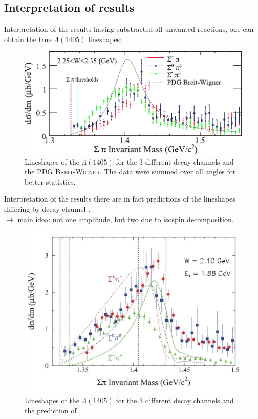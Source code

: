 \documentclass[11pt,aspectratio=1610,dvipsnames]{beamer}
\begin{document}
\subsection{Interpretation of results}
\begin{frame}{Interpretation of the results}
	having substracted all unwanted reactions, one can obtain the true $\Lambda(1405)$ lineshapes:
	\begin{figure}
		\centering
		\includegraphics[width=\linewidth,angle=0]{CLAS_lineshape_compare}
		\caption*{Lineshapes of the $\Lambda(1405)$ for the 3 different decay channels and the PDG \textsc{Breit-Wigner}. The data were summed over all angles for better statistics. \citet{lineshapes}}
	\end{figure}
\end{frame}
\begin{frame}{Interpretation of the results}
 there are in fact predictions of the lineshapes differing by decay channel \citet{nacher}. \\$\to$ main idea: not one amplitude, but two due to isospin decomposition.
	\begin{figure}
		\centering
		\includegraphics[width=.58\linewidth]{nacher}
		\caption*{Lineshapes of the $\Lambda(1405)$ for the 3 different decay channels and the prediction of \citet{nacher},  \citet{lineshapes}}
	\end{figure}
\end{frame}
\end{document}

